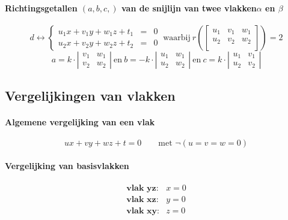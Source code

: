 \paragraph{Richtingsgetallen $(a,b,c,)$ van de snijlijn van twee vlakken$\alpha$ en $\beta$}
\label{sec:SnijlijnTweeVlakken}
 \[
   d \leftrightarrow 
   \left\{
     \begin{array}{rcl}
       u_1 x + v_1 y + w_1 z + t_1 & = & 0\\
       u_2 x + v_2 y + w_2 z + t_2 & = & 0
     \end{array}
   \right.
   \ 
   \textrm{waarbij}
   \  
   r\left( \left[
     \begin{array}{ccc}
       u_1 & v_1 & w_1\\
       u_2 & v_2 & w_2\\
     \end{array}
     \right] \right)
   = 2  
 \]
 \[
     a = k \cdot
       \left|
         \begin{array}{cc}
          v_1 & w_1 \\
          v_2 & w_2
         \end{array}
       \right|
     \ \textrm{en} \  
     b = -k \cdot
       \left|
         \begin{array}{cc}
          u_1 & w_1 \\
          u_2 & w_2
         \end{array}
       \right|
     \ \textrm{en} \ 
     c = k \cdot
       \left|
         \begin{array}{cc}
          u_1 & v_1 \\
          u_2 & v_2
         \end{array}
       \right|
 \]
 
\subsection{Vergelijkingen van vlakken}
\label{sec:VergelijkingenVlakken}

\paragraph{Algemene vergelijking van een vlak}
\label{sec:AlgVglVlak}
 \[
   ux + vy + wz + t = 0 \qquad \textrm{met \ } \neg\left(u=v=w=0\right)
 \]

\paragraph{Vergelijking van basisvlakken}
\label{sec:VergelijkingVanBasisvlakken}
 \[  
     \begin{array}{rl}
       \textbf{vlak yz:} & x=0\\
       \textbf{vlak xz:} & y=0\\
       \textbf{vlak xy:} & z=0\\
     \end{array}
 \]

